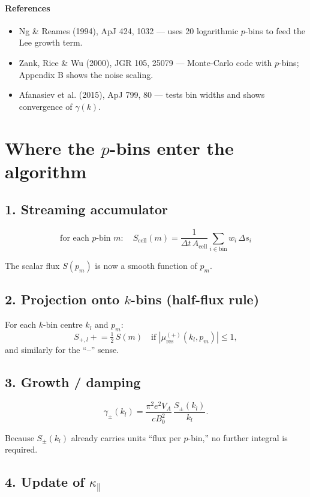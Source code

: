 \paragraph{References}
\begin{itemize}
\item Ng \& Reames (1994), ApJ 424, 1032 — uses 20 logarithmic $p$-bins to feed the Lee growth term.
\item Zank, Rice \& Wu (2000), JGR 105, 25079 — Monte-Carlo code with $p$-bins; Appendix B shows the noise scaling.
\item Afanasiev et al. (2015), ApJ 799, 80 — tests bin widths and shows convergence of $\gamma(k)$.
\end{itemize}

\section*{Where the $p$-bins enter the algorithm}

\subsection*{1. Streaming accumulator}

\[
\text{for each $p$-bin } m:\quad
S_{\text{cell}}(m) = \frac{1}{\Delta t\, A_{\text{cell}}}
\sum_{i \in \text{bin}} w_i\, \Delta s_i
\]


The scalar flux $S(p_m)$ is now a smooth function of $p_m$.

\subsection*{2. Projection onto $k$-bins (half-flux rule)}

For each $k$-bin centre $k_l$ and $p_m$:
\[
S_{+,l} \mathrel{+}= \tfrac{1}{2}\,S(m)
\quad \text{if } |\mu_{\text{res}}^{(+)}(k_l, p_m)| \le 1,
\]
and similarly for the “–” sense.

\subsection*{3. Growth / damping}

\[
\gamma_\pm(k_l) =
\frac{\pi^2 e^2 V_A}{c B_0^2} \,
\frac{S_\pm(k_l)}{k_l}.
\]

Because $S_\pm(k_l)$ already carries units “flux per $p$-bin,” no further integral is required.

\subsection*{4. Update of $\kappa_\parallel$}

